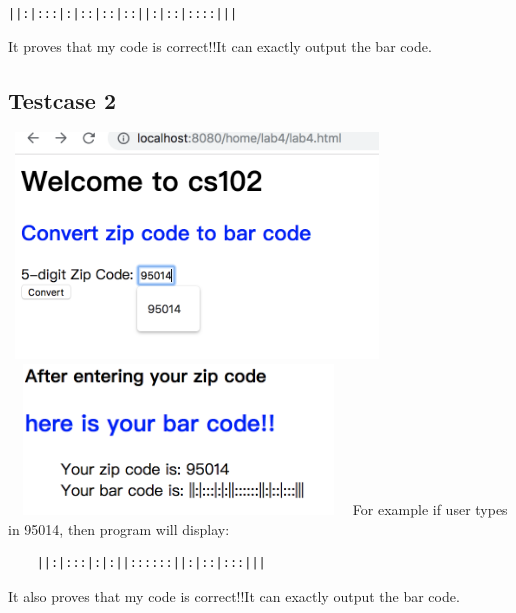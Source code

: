 \documentclass{article}
\begin{document}
\verb-||:|:::|:|::|::|::||:|::|::::|||-

It proves that my code is correct!!It can exactly output the bar code.

\subsection*{Testcase 2}
\includegraphics[width = 10cm, height = 6cm]{3.png}
\includegraphics[width = 9cm, height = 4cm]{6.png}
For example if user types in 95014, then program will display:

\begin{verbatim}
	||:|:::|:|:||::::::||:|::|:::|||
\end{verbatim}
It also proves that my code is correct!!It can exactly output the bar code.
\end{document}
